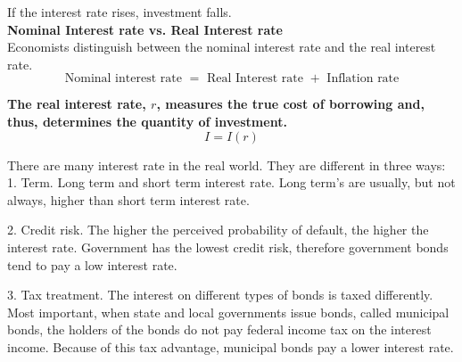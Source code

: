 \documentclass[12pt]{article}
\begin{document}
If the interest rate rises, investment falls.\\

{\textbf {Nominal Interest rate vs. Real Interest rate}}\\
Economists distinguish between the nominal interest rate and the real interest rate.
\begin{equation*}
\text{ Nominal interest rate } = \text{ Real Interest rate } + \text{ Inflation rate }
\end{equation*}

{\textbf {The real interest rate, $ r $, measures the true cost of borrowing and, 
thus, determines the quantity of investment.}}
\begin{equation*}
I = I(r)
\end{equation*}


\begin{figure}[H]
\end{figure}

There are many interest rate in the real world. They are different in three ways:\\
1. Term. Long term and short term interest rate. Long term's are usually, but not always,
higher than short term interest rate.

2. Credit risk. The higher the perceived probability of default, the higher the interest
rate. Government has the lowest credit risk, therefore government bonds tend to pay
a low interest rate.

3. Tax treatment. The interest on different types of bonds is taxed differently. Most important, when state and local governments issue bonds, called municipal bonds, the holders of the bonds do not pay federal income
tax on the interest income. Because of this tax advantage, municipal bonds pay a lower interest rate.
\end{document}
